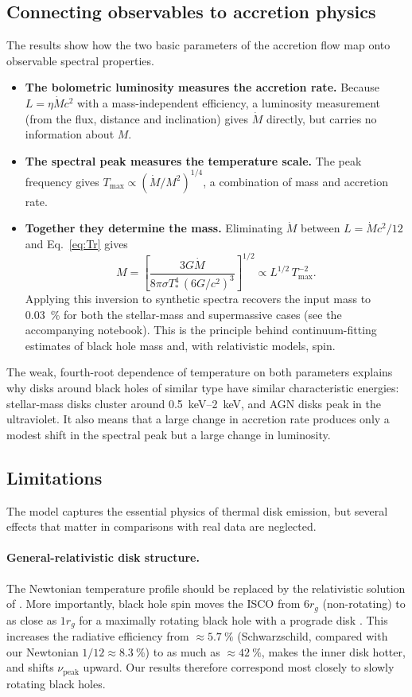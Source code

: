 \documentclass[11pt,a4paper]{article}
\newcommand{\Mdot}{\dot M}
\newcommand{\Tmax}{T_{\max}}
\newcommand{\nupk}{\nu_{\mathrm{peak}}}
\newcommand{\rg}{r_{g}}
\begin{document}
\subsection{Connecting observables to accretion physics}
The results show how the two basic parameters of the accretion flow map onto
observable spectral properties.
\begin{itemize}
  \item \textbf{The bolometric luminosity measures the accretion rate.}
        Because $L=\eta\Mdot c^2$ with a mass-independent efficiency, a
        luminosity measurement (from the flux, distance and inclination)
        gives $\Mdot$ directly, but carries no information about $M$.
  \item \textbf{The spectral peak measures the temperature scale.} The peak
        frequency gives $\Tmax\propto(\Mdot/M^2)^{1/4}$, a combination of
        mass and accretion rate.
  \item \textbf{Together they determine the mass.} Eliminating $\Mdot$
        between $L=\Mdot c^2/12$ and Eq.~\eqref{eq:Tr} gives
        \begin{equation}
          M=\left[\frac{3G\Mdot}{8\pi\sigma T_*^4\,(6G/c^2)^3}\right]^{1/2}
          \propto L^{1/2}\,\Tmax^{-2}.
        \end{equation}
        Applying this inversion to synthetic spectra recovers the input mass
        to \SI{0.03}{\percent} for both the stellar-mass and supermassive
        cases (see the accompanying notebook). This is the principle behind
        continuum-fitting estimates of black hole mass and, with relativistic
        models, spin.
\end{itemize}
The weak, fourth-root dependence of temperature on both parameters explains
why disks around black holes of similar type have similar characteristic
energies: stellar-mass disks cluster around \SIrange{0.5}{2}{keV}, and AGN
disks peak in the ultraviolet. It also means that a large change in
accretion rate produces only a modest shift in the spectral peak but a large
change in luminosity.

\subsection{Limitations}
The model captures the essential physics of thermal disk emission, but
several effects that matter in comparisons with real data are neglected.

\paragraph{General-relativistic disk structure.} The Newtonian temperature
profile should be replaced by the relativistic solution of
\citet{NovikovThorne1973}. More importantly, black hole spin moves the ISCO
from $6\rg$ (non-rotating) to as close as $1\rg$ for a maximally rotating
black hole with a prograde disk \citep{Bardeen1972}. This increases the
radiative efficiency from $\approx\SI{5.7}{\percent}$ (Schwarzschild, compared
with our Newtonian $1/12\approx\SI{8.3}{\percent}$) to as much as
$\approx\SI{42}{\percent}$, makes the inner disk hotter, and shifts $\nupk$
upward. Our results therefore correspond most closely to slowly rotating
black holes.
\end{document}
